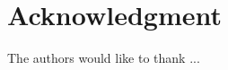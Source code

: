 \documentclass[journal]{IEEEtran}
\begin{document}
%
%
%
%


\section*{Acknowledgment}


The authors would like to thank ...


\ifCLASSOPTIONcaptionsoff
  \newpage
\fi
\end{document}
